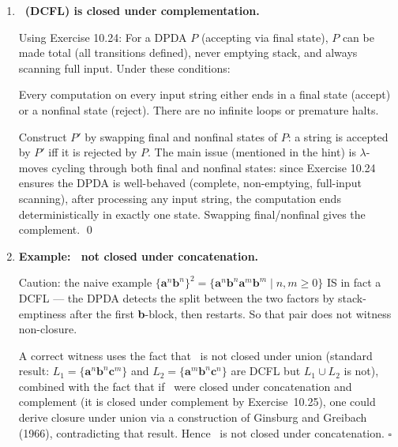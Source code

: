 \begin{enumerate}[{10.}1. ]
\begin{enumerate}
\item \textbf{Never empty stack}: Add a bottom-of-stack marker $\pmb{\$}$ pushed at the start. Rules that would pop the last symbol instead pop $\pmb{\$}$ and push it back (loop). Alternatively, ensure all stack-popping moves check that the stack has more than $\pmb{\$}$.

\item \textbf{Always scans full input}: After reaching a final state or dead state, keep reading input until $\pmb{\cent}$ (end marker) is reached without changing acceptance. Add transitions from all states (final or dead) that read any input symbol and stay in the same state.

All three modifications preserve determinism and do not change $L(P)$. \qed
\end{enumerate}

\item \textbf{\ASIG\ (DCFL) is closed under complementation.}

Using Exercise 10.24: For a DPDA $P$ (accepting via final state), $P$ can be made total (all transitions defined), never emptying stack, and always scanning full input. Under these conditions:

Every computation on every input string either ends in a final state (accept) or a nonfinal state (reject). There are no infinite loops or premature halts.

Construct $P'$ by swapping final and nonfinal states of $P$: a string is accepted by $P'$ iff it is rejected by $P$. The main issue (mentioned in the hint) is $\lambda$-moves cycling through both final and nonfinal states: since Exercise 10.24 ensures the DPDA is well-behaved (complete, non-emptying, full-input scanning), after processing any input string, the computation ends deterministically in exactly one state. Swapping final/nonfinal gives the complement. \qed

\item \textbf{Example: \ASIG\ not closed under concatenation.}

Caution: the naive example $\{\pmb{a}^n\pmb{b}^n\}^2 = \{\pmb{a}^n\pmb{b}^n\pmb{a}^m\pmb{b}^m \mid n,m\geq 0\}$ IS in fact a DCFL — the DPDA detects the split between the two factors by stack-emptiness after the first \textbf{b}-block, then restarts. So that pair does not witness non-closure.

A correct witness uses the fact that \ASIG\ is not closed under union (standard result: $L_1=\{\pmb{a}^n\pmb{b}^n\pmb{c}^m\}$ and $L_2=\{\pmb{a}^m\pmb{b}^n\pmb{c}^n\}$ are DCFL but $L_1\cup L_2$ is not), combined with the fact that if \ASIG\ were closed under concatenation and complement (it is closed under complement by Exercise~10.25), one could derive closure under union via a construction of Ginsburg and Greibach (1966), contradicting that result. Hence \ASIG\ is not closed under concatenation. $\square$


\end{enumerate}
